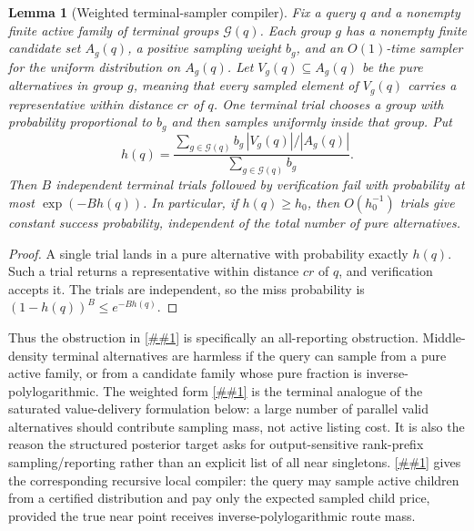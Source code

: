 \documentclass[10pt]{article}
\newcommand{\cref}[1]{\ref{##1}}
\newcommand{\Cref}[1]{\ref{##1}}
\newtheorem{lemma}[theorem]{Lemma}
\theoremstyle{definition}
\begin{document}
\begin{lemma}[Weighted terminal-sampler compiler]
   \label{lem:weighted-terminal-sampler}
   Fix a query $q$ and a nonempty finite active family of terminal groups
   $\mathcal G(q)$.  Each group $g$ has a nonempty finite candidate set
   $A_g(q)$, a positive sampling weight $b_g$, and an $O(1)$-time sampler for
   the uniform distribution on $A_g(q)$.  Let $V_g(q)\subseteq A_g(q)$ be the
   pure alternatives in group $g$, meaning that every sampled element of
   $V_g(q)$ carries a representative within distance $cr$ of $q$.  One
   terminal trial chooses a group with probability proportional to $b_g$ and
   then samples uniformly inside that group.  Put
   \[
      h(q)=
      \frac{\sum_{g\in\mathcal G(q)}
         b_g\,|V_g(q)|/|A_g(q)|}
           {\sum_{g\in\mathcal G(q)}b_g}.
   \]
   Then $B$ independent terminal trials followed by verification fail with
   probability at most $\exp(-Bh(q))$.  In particular, if
   $h(q)\ge h_0$, then $O(h_0^{-1})$ trials give constant success probability,
   independent of the total number of pure alternatives.
\end{lemma}

\begin{proof}
   A single trial lands in a pure alternative with probability exactly $h(q)$.
   Such a trial returns a representative within distance $cr$ of $q$, and
   verification accepts it.  The trials are independent, so the miss
   probability is $(1-h(q))^B\le e^{-Bh(q)}$.
\end{proof}

Thus the obstruction in
\cref{lem:middle-density-singleton-obstruction} is specifically an
all-reporting obstruction.  Middle-density terminal alternatives are harmless
if the query can sample from a pure active family, or from a candidate family
whose pure fraction is inverse-polylogarithmic.  The weighted form
\cref{lem:weighted-terminal-sampler} is the terminal analogue of the saturated
value-delivery formulation below: a large number of parallel valid alternatives
should contribute sampling mass, not active listing cost.  It is also the
reason the structured posterior target asks for output-sensitive rank-prefix
sampling/reporting rather than an explicit list of all near singletons.
\Cref{lem:sampled-priced-cover} gives the corresponding recursive local
compiler: the query may sample active children from a certified distribution
and pay only the expected sampled child price, provided the true near point
receives inverse-polylogarithmic route mass.
\end{document}
